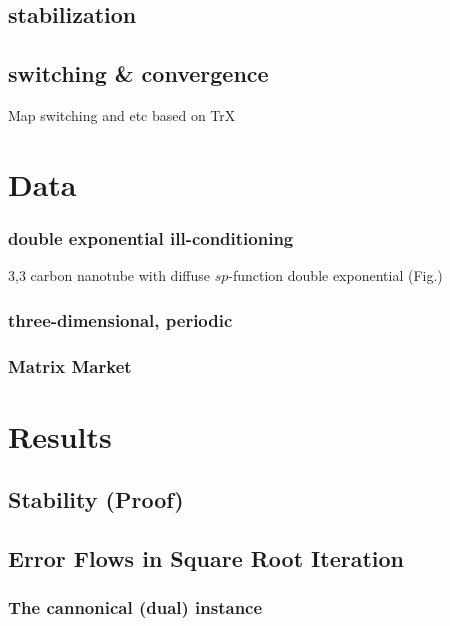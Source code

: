 \documentclass[letterpaper,twocolumn,amsmath,amsfont,amssymb,english,aps,jcp,preprintnumbers,groupaddress,nofootinbib,tightenlines]{revtex4}
\begin{document}
\subsection{stabilization}

\subsection{switching \& convergence}
Map switching and etc based on TrX

\section{Data}

\subsubsection{double exponential ill-conditioning}
3,3 carbon nanotube with diffuse $sp$-function
double exponential (Fig.)

\subsubsection{three-dimensional, periodic}
\subsubsection{Matrix Market}


\section{Results}

\subsection{Stability (Proof)}


\subsection{Error Flows in Square Root Iteration}

\subsubsection{The cannonical (dual) instance}
 
\end{document}

